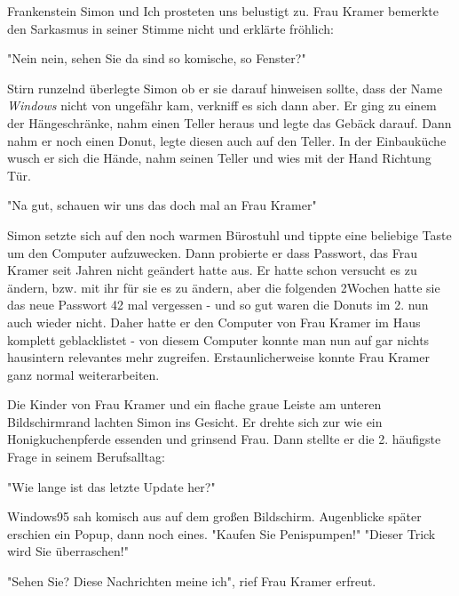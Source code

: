 \documentclass[ebook]{article}
\begin{document}
\noindent Frankenstein Simon und Ich prosteten uns belustigt zu. Frau
Kramer bemerkte den Sarkasmus in seiner Stimme nicht und erklärte
fröhlich:

\begin{center}
"Nein nein, sehen Sie da sind so komische, so Fenster?"
\end{center}

\noindent Stirn runzelnd überlegte Simon ob er sie darauf hinweisen
sollte, dass der Name \emph{Windows} nicht von ungefähr kam, verkniff es
sich dann aber. Er ging zu einem der Hängeschränke, nahm einen
Teller heraus und legte das Gebäck darauf. Dann nahm er noch einen
Donut, legte diesen auch auf den Teller. In der Einbauküche wusch er
sich die Hände, nahm seinen Teller und wies mit der Hand Richtung
Tür.

\begin{center}
"Na gut, schauen wir uns das doch mal an Frau Kramer"
\end{center}

\noindent Simon setzte sich auf den noch warmen Bürostuhl und tippte
eine beliebige Taste um den Computer aufzuwecken. Dann probierte er
dass Passwort, das Frau Kramer seit Jahren nicht geändert hatte
aus. Er hatte schon versucht es zu ändern, bzw. mit ihr für sie es
zu ändern, aber die folgenden 2Wochen hatte sie das neue Passwort
42 mal vergessen - und so gut waren die Donuts im 2. nun auch wieder
nicht. Daher hatte er den Computer von Frau Kramer im Haus komplett
geblacklistet - von diesem Computer konnte man nun auf gar nichts
hausintern relevantes mehr zugreifen. Erstaunlicherweise konnte Frau
Kramer ganz normal weiterarbeiten.

\noindent Die Kinder von Frau Kramer und ein flache graue Leiste am
unteren Bildschirmrand lachten Simon ins Gesicht. Er drehte sich zur
wie ein Honigkuchenpferde essenden und grinsend Frau. Dann stellte
er die 2. häufigste Frage in seinem Berufsalltag:

\begin{center}
"Wie lange ist das letzte Update her?"
\end{center}

\noindent Windows95 sah komisch aus auf dem großen
Bildschirm. Augenblicke später erschien ein Popup, dann noch
eines. "Kaufen Sie Penispumpen!" "Dieser Trick wird Sie
überraschen!"

\begin{center}
"Sehen Sie? Diese Nachrichten meine ich", rief Frau Kramer erfreut.
\end{center}
\end{document}
